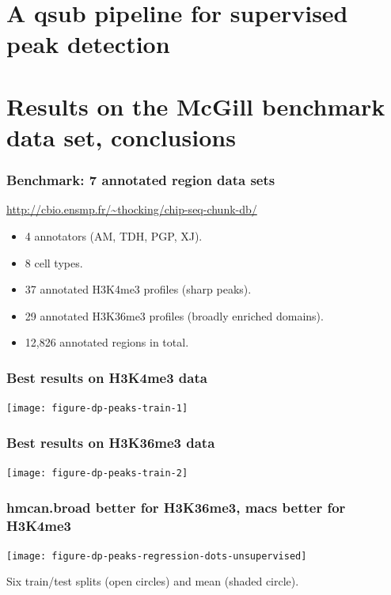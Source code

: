 \documentclass{beamer}
\begin{document}
\section{A qsub pipeline for supervised peak detection}


\section{Results on the McGill benchmark data set, conclusions}

\begin{frame}
  \frametitle{Benchmark: 7 annotated region data sets}
  \url{http://cbio.ensmp.fr/~thocking/chip-seq-chunk-db/}
  \begin{itemize}
  \item 4 annotators (AM, TDH, PGP, XJ).
  \item 8 cell types.
  \item 37 annotated H3K4me3 profiles (sharp peaks).
  \item 29 annotated H3K36me3 profiles (broadly enriched domains).
  \item 12,826 annotated regions in total.
  \end{itemize}
\end{frame}

\begin{frame}
  \frametitle{Best results on H3K4me3 data}
  \texttt{[image: figure-dp-peaks-train-1]}
\end{frame}

\begin{frame}
  \frametitle{Best results on H3K36me3 data}
  \texttt{[image: figure-dp-peaks-train-2]}
\end{frame}

\begin{frame}
  \frametitle{hmcan.broad better for H3K36me3, macs better for
    H3K4me3}

  \texttt{[image: figure-dp-peaks-regression-dots-unsupervised]}
  
  Six train/test splits (open circles) and mean (shaded circle).
\end{frame}
\end{document}
